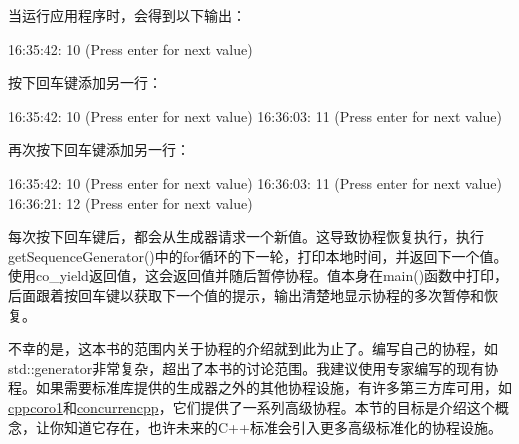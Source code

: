 当运行应用程序时，会得到以下输出：

\begin{shell}
16:35:42: 10 (Press enter for next value)
\end{shell}

按下回车键添加另一行：

\begin{shell}
16:35:42: 10 (Press enter for next value)
16:36:03: 11 (Press enter for next value)
\end{shell}

再次按下回车键添加另一行：

\begin{shell}
16:35:42: 10 (Press enter for next value)
16:36:03: 11 (Press enter for next value)
16:36:21: 12 (Press enter for next value)
\end{shell}

每次按下回车键后，都会从生成器请求一个新值。这导致协程恢复执行，执行getSequenceGenerator()中的for循环的下一轮，打印本地时间，并返回下一个值。使用co\_yield返回值，这会返回值并随后暂停协程。值本身在main()函数中打印，后面跟着按回车键以获取下一个值的提示，输出清楚地显示协程的多次暂停和恢复。

不幸的是，这本书的范围内关于协程的介绍就到此为止了。编写自己的协程，如std::generator非常复杂，超出了本书的讨论范围。我建议使用专家编写的现有协程。如果需要标准库提供的生成器之外的其他协程设施，有许多第三方库可用，如\href{https://github.com/lewissbaker/cppcoro}{cppcoro1}和\href{https://github.com/David-Haim/concurrencpp}{concurrencpp}，它们提供了一系列高级协程。本节的目标是介绍这个概念，让你知道它存在，也许未来的C++标准会引入更多高级标准化的协程设施。




